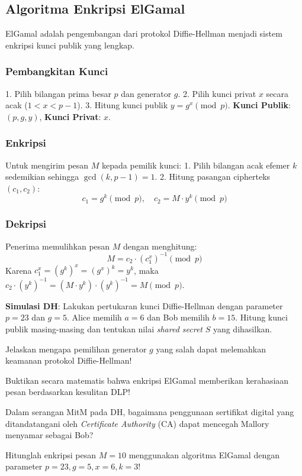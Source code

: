 \subsection{Algoritma Enkripsi ElGamal}

ElGamal adalah pengembangan dari protokol Diffie-Hellman menjadi sistem enkripsi kunci publik yang lengkap.

\subsubsection{Pembangkitan Kunci}
1. Pilih bilangan prima besar $p$ dan generator $g$.
2. Pilih kunci privat $x$ secara acak ($1 < x < p-1$).
3. Hitung kunci publik $y = g^x \pmod{p}$.
\textbf{Kunci Publik}: $(p, g, y)$, \textbf{Kunci Privat}: $x$.

\subsubsection{Enkripsi}
Untuk mengirim pesan $M$ kepada pemilik kunci:
1. Pilih bilangan acak efemer $k$ sedemikian sehingga $\gcd(k, p-1) = 1$.
2. Hitung pasangan cipherteks $(c_1, c_2)$:
   \[ c_1 = g^k \pmod{p}, \quad c_2 = M \cdot y^k \pmod{p} \]

\subsubsection{Dekripsi}
Penerima memulihkan pesan $M$ dengan menghitung:
\[ M = c_2 \cdot (c_1^x)^{-1} \pmod{p} \]
Karena $c_1^x = (g^k)^x = (g^x)^k = y^k$, maka $c_2 \cdot (y^k)^{-1} = (M \cdot y^k) \cdot (y^k)^{-1} = M \pmod{p}$.

\begin{aktivitas}
  \item \textbf{Simulasi DH}: Lakukan pertukaran kunci Diffie-Hellman dengan parameter $p=23$ dan $g=5$. Alice memilih $a=6$ dan Bob memilih $b=15$. Hitung kunci publik masing-masing dan tentukan nilai \textit{shared secret} $S$ yang dihasilkan.
\end{aktivitas}

\begin{latihan}
  \item Jelaskan mengapa pemilihan generator $g$ yang salah dapat melemahkan keamanan protokol Diffie-Hellman!
  \item Buktikan secara matematis bahwa enkripsi ElGamal memberikan kerahasiaan pesan berdasarkan kesulitan DLP!
  \item Dalam serangan MitM pada DH, bagaimana penggunaan sertifikat digital yang ditandatangani oleh \textit{Certificate Authority} (CA) dapat mencegah Mallory menyamar sebagai Bob?
  \item Hitunglah enkripsi pesan $M=10$ menggunakan algoritma ElGamal dengan parameter $p=23, g=5, x=6, k=3$!
\end{latihan}
